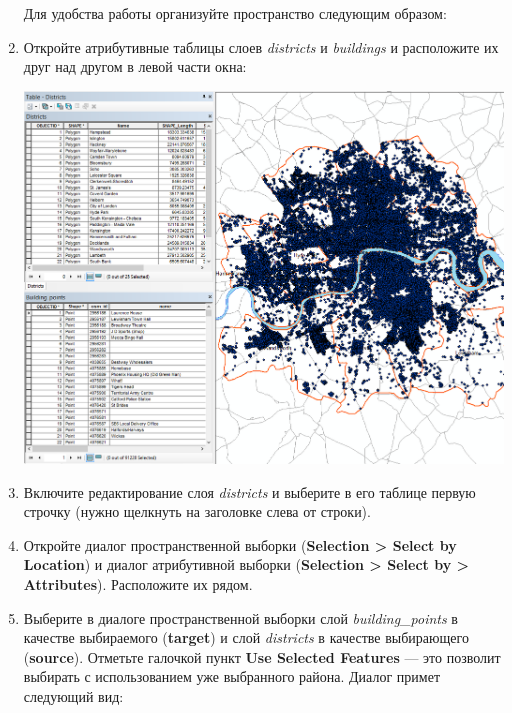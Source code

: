 \documentclass[]{book}
\theoremstyle{definition}
\theoremstyle{definition}
\theoremstyle{definition}
\theoremstyle{remark}
\begin{document}
\begin{enumerate}
  Для удобства работы организуйте пространство следующим образом:
\item
  Откройте атрибутивные таблицы слоев \emph{districts} и
  \emph{buildings} и расположите их друг над другом в левой части окна:

  \includegraphics{images/Ex06/image16.png}
\item
  Включите редактирование слоя \emph{districts} и выберите в его таблице
  первую строчку (нужно щелкнуть на заголовке слева от строки).
\item
  Откройте диалог пространственной выборки (\textbf{Selection
  \textgreater{} Select by Location}) и диалог атрибутивной выборки
  (\textbf{Selection \textgreater{} Select by \textgreater{}
  Attributes}). Расположите их рядом.
\item
  Выберите в диалоге пространственной выборки слой
  \emph{building\_points} в качестве выбираемого (\textbf{target}) и
  слой \emph{districts} в качестве выбирающего (\textbf{source}).
  Отметьте галочкой пункт \textbf{Use Selected Features} --- это
  позволит выбирать с использованием уже выбранного района. Диалог
  примет следующий вид:


\end{enumerate}
\end{document}
